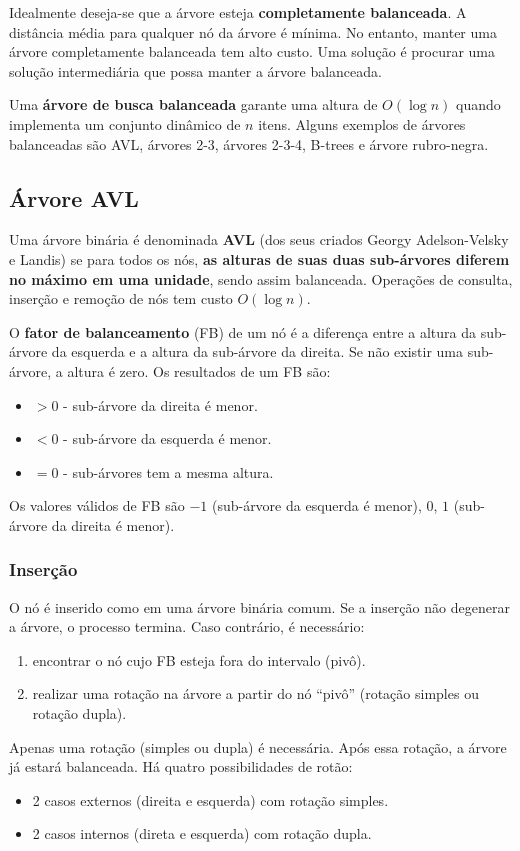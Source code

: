 Idealmente deseja-se que a árvore esteja {\bf completamente balanceada}.
A distância média para qualquer nó da árvore é mínima.
No entanto, manter uma árvore completamente balanceada tem alto custo.
Uma solução é procurar uma solução intermediária que possa manter a árvore
balanceada.

Uma {\bf árvore de busca balanceada} garante uma altura de $O(\log n)$
quando implementa um conjunto dinâmico de $n$ itens.
Alguns exemplos de árvores balanceadas são AVL, árvores 2-3, árvores 2-3-4,
B-trees e árvore rubro-negra.

\subsection{Árvore AVL}

Uma árvore binária é denominada {\bf AVL} (dos seus criados Georgy
Adelson-Velsky e Landis) se para todos os nós, {\bf as alturas de suas duas
sub-árvores diferem no máximo em uma unidade}, sendo assim balanceada.
Operações de consulta, inserção e remoção de nós tem custo $O(\log n)$.

O {\bf fator de balanceamento} (FB) de um nó é a diferença entre
a altura da sub-árvore da esquerda e a altura da sub-árvore da direita.
Se não existir uma sub-árvore, a altura é zero.
Os resultados de um FB são:
\begin{itemize}
\item $> 0$ - sub-árvore da direita é menor.
\item $< 0$ - sub-árvore da esquerda é menor.
\item $= 0$ - sub-árvores tem a mesma altura.
\end{itemize}
Os valores válidos de FB são $-1$ (sub-árvore da esquerda é menor), $0$, $1$
(sub-árvore da direita é menor).

\subsubsection{Inserção}

O nó é inserido como em uma árvore binária comum.
Se a inserção não degenerar a árvore, o processo termina.
Caso contrário, é necessário:
\begin{enumerate}
\item encontrar o nó cujo FB esteja fora do intervalo (pivô).
\item realizar uma rotação na árvore a partir do nó ``pivô''
(rotação simples ou rotação dupla).
\end{enumerate}
Apenas uma rotação (simples ou dupla) é necessária.
Após essa rotação, a árvore já estará balanceada.
Há quatro possibilidades de rotão:
\begin{itemize}
\item 2 casos externos (direita e esquerda) com rotação simples.
\item 2 casos internos (direta e esquerda) com rotação dupla.
\end{itemize}

